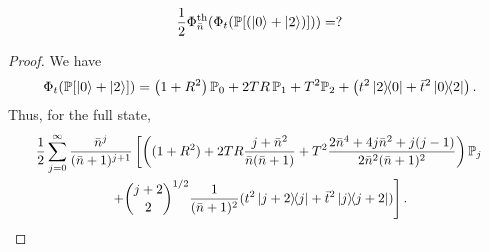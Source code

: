 \documentclass[12pt]{report}
\newcommand{\PP}{\mathbb{P}}
\begin{document}
\begin{prop}
	\begin{equation}
		\frac{1}{2}\Phi_{\bar n}^{\rm th}(\Phi_t(\PP[(\ket0+\ket2)])) = ?
	\end{equation}
\end{prop}
\begin{proof}
	We have
	\begin{equation}
		\Phi_t(\PP[\ket0+\ket2]) = 
		\left(1+R^2\right) \PP_0
		+ 2TR \, \PP_1
		+ T^2 \PP_2
		+ \left(
			t^2 \ketbra{2}{0} + \bar t^2 \ketbra{0}{2}
		\right).
	\end{equation}
	Thus, for the full state,
	\begin{equation}\scalebox{0.95}{$\displaystyle
	\begin{gathered}
		\frac12\sum_{j=0}^\infty
		\frac{\bar n^j}{(\bar n + 1)^{j+1}}
		\left[
		\left((1+R^2)
		+ 2TR \frac{j+\bar n^2}{\bar n(\bar n + 1)}
		+ T^2 \frac{2\bar n^4+4j \bar n^2 + j(j-1)}{2\bar n^2(\bar n + 1)^2}
		\right) \PP_j
		\right. \\
		\left. + \binom{j+2}{2}^{1/2} \frac{1}{(\bar n + 1)^2}
		(t^2 \ketbra{j+2}{j} + \bar t^2 \ketbra{j}{j+2})
		\right].
	\end{gathered}
	$}\end{equation}
\end{proof}
\end{document}
